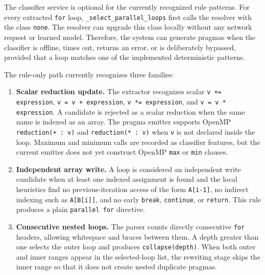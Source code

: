 The classifier service is optional for the currently recognized rule patterns.
For every extracted \texttt{for} loop, \texttt{\_select\_parallel\_loops}
first calls the resolver with the class \texttt{none}. The resolver can upgrade
this class locally without any network request or learned model. Therefore, the
system can generate pragmas when the classifier is offline, times out, returns
an error, or is deliberately bypassed, provided that a loop matches one of the
implemented deterministic patterns.

The rule-only path currently recognizes three families:

\begin{enumerate}[leftmargin=1.2cm]
  \item \textbf{Scalar reduction update.} The extractor recognizes scalar
  \texttt{v += expression}, \texttt{v = v + expression},
  \texttt{v *= expression}, and \texttt{v = v * expression}. A candidate is
  rejected as a scalar reduction when the same name is indexed as an array.
  The pragma emitter supports OpenMP \texttt{reduction(+ : v)} and
  \texttt{reduction(* : v)} when \texttt{v} is not declared inside the loop.
  Maximum and minimum calls are recorded as classifier features, but the current
  emitter does not yet construct OpenMP \texttt{max} or \texttt{min} clauses.

  \item \textbf{Independent array write.} A loop is considered an independent
  write candidate when at least one indexed assignment is found and the local
  heuristics find no previous-iteration access of the form \texttt{A[i-1]}, no
  indirect indexing such as \texttt{A[B[i]]}, and no early
  \texttt{break}, \texttt{continue}, or \texttt{return}. This rule produces a
  plain \texttt{parallel for} directive.

  \item \textbf{Consecutive nested loops.} The parser counts directly
  consecutive \texttt{for} headers, allowing whitespace and braces between
  them. A depth greater than one selects the outer loop and produces
  \texttt{collapse(depth)}. When both outer and inner ranges appear in the
  selected-loop list, the rewriting stage skips the inner range so that it does
  not create nested duplicate pragmas.
\end{enumerate}

